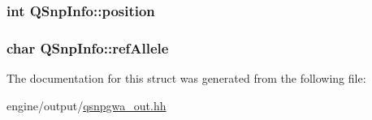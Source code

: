 \label{structQSnpInfo_a5c52643a7fd95d1ea89735a57ff68771}
\hypertarget{structQSnpInfo_a71189167084540664f90f7cfb349253c}{
\subsubsection[{position}]{\setlength{\rightskip}{0pt plus 5cm}int {\bf QSnpInfo::position}}}
\label{structQSnpInfo_a71189167084540664f90f7cfb349253c}
\hypertarget{structQSnpInfo_aaba3afdbc3fb7b400c84e942ccc30dc6}{
\subsubsection[{refAllele}]{\setlength{\rightskip}{0pt plus 5cm}char {\bf QSnpInfo::refAllele}}}
\label{structQSnpInfo_aaba3afdbc3fb7b400c84e942ccc30dc6}


The documentation for this struct was generated from the following file:\begin{DoxyCompactItemize}
\item 
engine/output/\hyperlink{qsnpgwa__out_8hh}{qsnpgwa\_\-out.hh}\end{DoxyCompactItemize}
